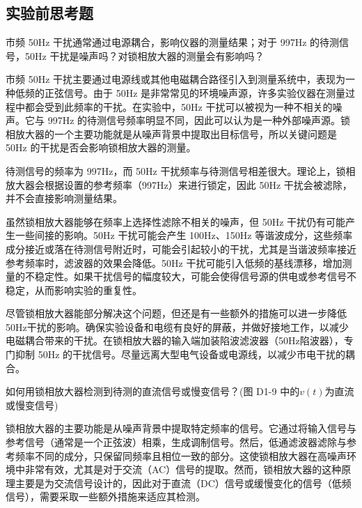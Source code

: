 \documentclass[dvipsnames, svgnames,a4paper,11pt]{article}
\begin{document}
	




\subsection{实验前思考题}

\begin{question}
	市频 50Hz 干扰通常通过电源耦合，影响仪器的测量结果；对于 997Hz 的待测信号，50Hz 干扰是噪声吗？对锁相放大器的测量会有影响吗？
\end{question}

市频 50Hz 干扰主要通过电源线或其他电磁耦合路径引入到测量系统中，表现为一种低频的正弦信号。由于 50Hz 是非常常见的环境噪声源，许多实验仪器在测量过程中都会受到此频率的干扰。在实验中，50Hz 干扰可以被视为一种不相关的噪声。它与 997Hz 的待测信号频率明显不同，因此可以认为是一种外部噪声源。锁相放大器的一个主要功能就是从噪声背景中提取出目标信号，所以关键问题是 50Hz 的干扰是否会影响锁相放大器的测量。

待测信号的频率为 997Hz，而 50Hz 干扰频率与待测信号相差很大。理论上，锁相放大器会根据设置的参考频率（997Hz）来进行锁定，因此 50Hz 干扰会被滤除，并不会直接影响测量结果。

虽然锁相放大器能够在频率上选择性滤除不相关的噪声，但 50Hz 干扰仍有可能产生一些间接的影响。50Hz 干扰可能会产生 100Hz、150Hz 等谐波成分，这些频率成分接近或落在待测信号附近时，可能会引起较小的干扰，尤其是当谐波频率接近参考频率时，滤波器的效果会降低。50Hz 干扰可能引入低频的基线漂移，增加测量的不稳定性。如果干扰信号的幅度较大，可能会使得信号源的供电或参考信号不稳定，从而影响实验的重复性。

尽管锁相放大器能部分解决这个问题，但还是有一些额外的措施可以进一步降低50Hz干扰的影响。确保实验设备和电缆有良好的屏蔽，并做好接地工作，以减少电磁耦合带来的干扰。在锁相放大器的输入端加装陷波滤波器（50Hz陷波器），专门抑制 50Hz 的干扰信号。尽量远离大型电气设备或电源线，以减少市电干扰的耦合。
	


\begin{question}
	如何用锁相放大器检测到待测的直流信号或慢变信号？(图 D1-9 中的$v(t)$为直流或慢变信号)
\end{question}

锁相放大器的主要功能是从噪声背景中提取特定频率的信号。它通过将输入信号与参考信号（通常是一个正弦波）相乘，生成调制信号。然后，低通滤波器滤除与参考频率不同的成分，只保留同频率且相位一致的部分。这使锁相放大器在高噪声环境中非常有效，尤其是对于交流（AC）信号的提取。然而，锁相放大器的这种原理主要是为交流信号设计的，因此对于直流（DC）信号或缓慢变化的信号（低频信号），需要采取一些额外措施来适应其检测。
\end{document}
